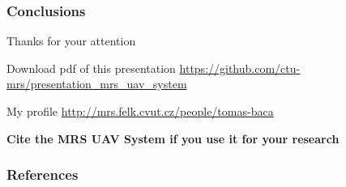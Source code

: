 \documentclass[aspectratio=169]{beamer}
\begin{document}


\begin{frame}
  \frametitle{Conclusions}

  \begin{center}
    \huge Thanks for your attention\\
  \end{center}

  \begin{block}{Download pdf of this presentation}
    \centering
    \Large\url{https://github.com/ctu-mrs/presentation_mrs_uav_system}
  \end{block}

  \begin{block}{My profile}
    \centering
    \Large\url{http://mrs.felk.cvut.cz/people/tomas-baca}
  \end{block}

  \begin{block}{\centering \textbf{Cite the MRS UAV System if you use it for your research}}
    \small {}
  \end{block}

\end{frame}



\DeclareCiteCommand{\fullcite}
{}
{%
  \usedriver
  {%
  }
{}}
{\multicitedelim}
{}

\begin{frame}[allowframebreaks]
  \frametitle{References}
  \tiny{
    \printbibliography[heading=none,title={}]
  }
\end{frame}

\end{document}
